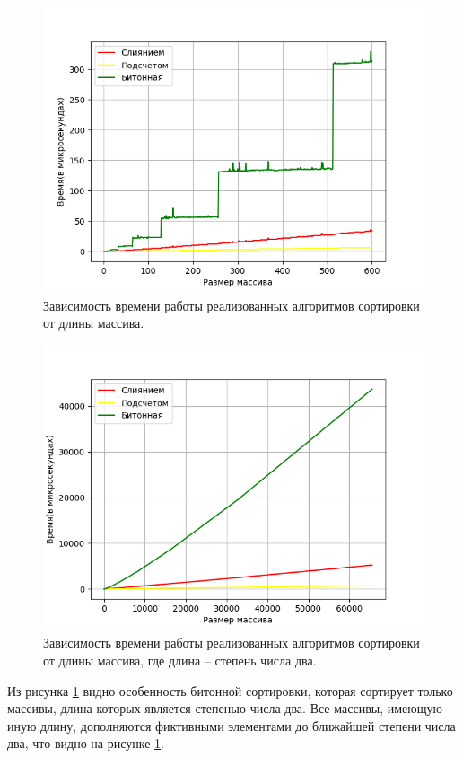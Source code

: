 \begin{figure}[h]
	\centering
	\includegraphics[width=140mm]{images/result}
	\caption{Зависимость времени работы реализованных алгоритмов сортировки от длины массива.}
	\label{img:result}
\end{figure}
\begin{figure}[h]
	\centering
	\includegraphics[width=140mm]{images/resultDegree}
	\caption{Зависимость времени работы реализованных алгоритмов сортировки от длины массива, где длина -- степень числа два.}
	\label{img:resultDegree}
\end{figure}

\clearpage
Из рисунка \ref{img:result} видно особенность битонной сортировки, которая сортирует только массивы, длина которых является степенью числа два. Все массивы, имеющую иную длину, дополняются фиктивными элементами до ближайшей степени числа два, что видно на рисунке \ref{img:result}. 

